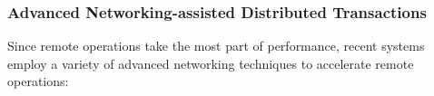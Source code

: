 





\subsubsection{Advanced Networking-assisted Distributed Transactions} 
Since remote operations take the most part of performance, recent systems employ a variety of advanced networking techniques to accelerate remote operations:






